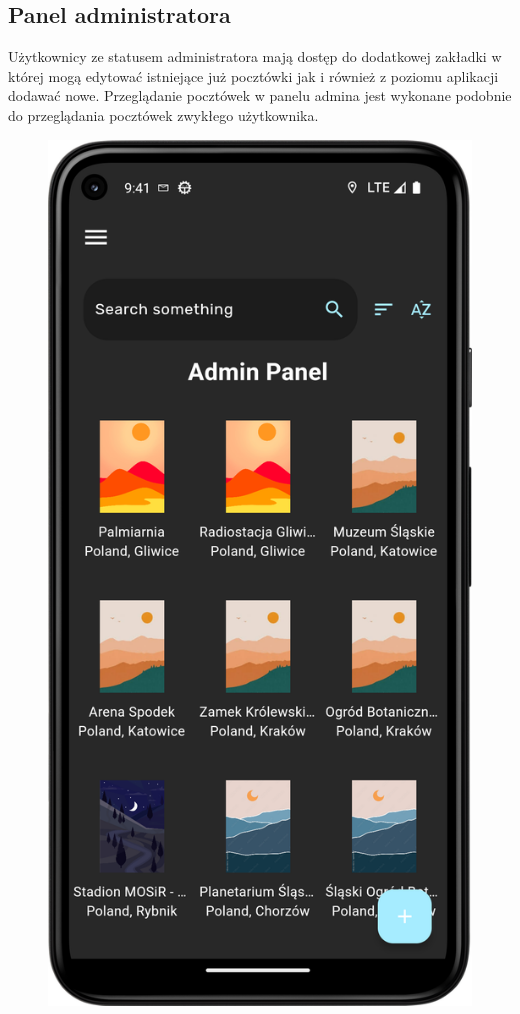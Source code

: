 \documentclass[a4paper,twoside,12pt]{book}
\begin{document}
\subsection{Panel administratora}
Użytkownicy ze statusem administratora mają dostęp do dodatkowej zakładki w której mogą edytować istniejące już pocztówki jak i również z poziomu aplikacji dodawać nowe. Przeglądanie pocztówek w panelu admina jest wykonane podobnie do przeglądania pocztówek zwykłego użytkownika.

\begin{figure}[H]
  \centering
  \begin{minipage}[b]{0.49\textwidth}
    \includegraphics[width=\textwidth]{mobile_ss/admin.png}

\end{minipage}
\end{figure}
\end{document}
